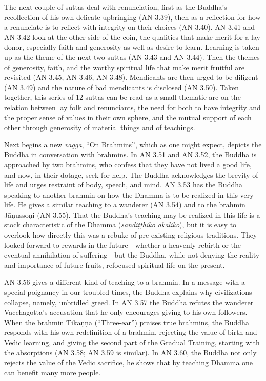 \documentclass[12pt,openany]{book}%
\begin{document}
The next couple of suttas deal with renunciation, first as the Buddha’s recollection of his own delicate upbringing (AN 3.39), then as a reflection for how a renunciate is to reflect with integrity on their choices (AN 3.40). AN 3.41 and AN 3.42 look at the other side of the coin, the qualities that make merit for a lay donor, especially faith and generosity as well as desire to learn. Learning is taken up as the theme of the next two suttas (AN 3.43 and AN 3.44). Then the themes of generosity, faith, and the worthy spiritual life that make merit fruitful are revisited (AN 3.45, AN 3.46, AN 3.48). Mendicants are then urged to be diligent (AN 3.49) and the nature of bad mendicants is disclosed (AN 3.50). Taken together, this series of 12 suttas can be read as a small thematic arc on the relation between lay folk and renunciants, the need for both to have integrity and the proper sense of values in their own sphere, and the mutual support of each other through generosity of material things and of teachings.

Next begins a new \textit{vagga}, “On Brahmins”, which as one might expect, depicts the Buddha in conversation with brahmins. In AN 3.51 and AN 3.52, the Buddha is approached by two brahmins, who confess that they have not lived a good life, and now, in their dotage, seek for help. The Buddha acknowledges the brevity of life and urges restraint of body, speech, and mind. AN 3.53 has the Buddha speaking to another brahmin on how the Dhamma is to be realized in this very life. He gives a similar teaching to a wanderer (AN 3.54) and to the brahmin \textsanskrit{Jāṇussoṇi} (AN 3.55). That the Buddha’s teaching may be realized in this life is a stock characteristic of the Dhamma (\textit{\textsanskrit{sandiṭṭhiko} \textsanskrit{akāliko}}), but it is easy to overlook how directly this was a rebuke of pre-existing religious traditions. They looked forward to rewards in the future—whether a heavenly rebirth or the eventual annihilation of suffering—but the Buddha, while not denying the reality and importance of future fruits, refocused spiritual life on the present.

AN 3.56 gives a different kind of teaching to a brahmin. In a message with a special poignancy in our troubled times, the Buddha explains why civilizations collapse, namely, unbridled greed. In AN 3.57 the Buddha refutes the wanderer Vacchagotta’s accusation that he only encourages giving to his own followers. When the brahmin \textsanskrit{Tikaṇṇa} (“Three-ear”) praises true brahmins, the Buddha responds with his own redefinition of a brahmin, rejecting the value of birth and Vedic learning, and giving the second part of the Gradual Training, starting with the absorptions (AN 3.58; AN 3.59 is similar). In AN 3.60, the Buddha not only rejects the value of the Vedic sacrifice, he shows that by teaching Dhamma one can benefit many more people.
\end{document}
